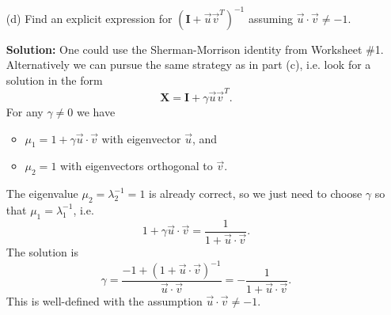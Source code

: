 \documentclass[11pt,fleqn]{article}
\begin{document}
\begin{enumerate}
\begin{itemize}
	{\bf Solution:} The eigenvectors and eigenvalues of $\mathbf{X}^2$ are
		\begin{itemize}
		\item $\lambda_1 = 1 + \vec{u}\cdot\vec{v}$ with eigenvector $\vec{u}$, and
		\item $\lambda_2 = 1$ with eigenvectors orthogonal to $\vec{v}$.
		\end{itemize}
		Since the matrix is diagonalizable we can take the square root by just applying the square root to the eigenvalues and leaving the eigenvectors unchanged.
	Adding the identity does not change eigenvectors, and multiplying by a constant does not change eigenvectors, so consider 
	\[\mathbf{X} = \mathbf{I} + \beta \vec{u}\vec{v}^T.\]
	For any $\beta\neq 0$ we have
		\begin{itemize}
		\item $\mu_1 = 1 + \beta\vec{u}\cdot\vec{v}$ with eigenvector $\vec{u}$, and
		\item $\mu_2 = 1$ with eigenvectors orthogonal to $\vec{v}$.
		\end{itemize}
		The eigenvalue $\mu_2=\sqrt{\lambda_2} = 1$ is already correct, so we just need to choose $\beta$ so that $\mu_1 = \sqrt{\lambda_1}$, i.e.
		\[1+\beta \vec{u}\cdot\vec{v} = \sqrt{1 + \vec{u}\cdot\vec{v}}.\]
		The solution is
		\[\beta = \frac{-1+\sqrt{1+\vec{u}\cdot\vec{v}}}{\vec{u}\cdot\vec{v}} = \frac{1}{1+\sqrt{1+\vec{u}\cdot\vec{v}}}.\]
	\item[(d)] Find an explicit expression for $(\mathbf{I} + \vec{u}\vec{v}^T)^{-1}$ assuming $\vec{u}\cdot\vec{v}\neq -1$.
	
	{\bf Solution:} One could use the Sherman-Morrison identity from Worksheet \#1. Alternatively we can pursue the same strategy as in part (c), i.e. look for a solution in the form
		\[\mathbf{X} = \mathbf{I} + \gamma \vec{u}\vec{v}^T.\]
	For any $\gamma\neq 0$ we have
		\begin{itemize}
		\item $\mu_1 = 1 + \gamma\vec{u}\cdot\vec{v}$ with eigenvector $\vec{u}$, and
		\item $\mu_2 = 1$ with eigenvectors orthogonal to $\vec{v}$.
		\end{itemize}
		The eigenvalue $\mu_2=\lambda_2^{-1} = 1$ is already correct, so we just need to choose $\gamma$ so that $\mu_1 = \lambda_1^{-1}$, i.e.
		\[1+\gamma \vec{u}\cdot\vec{v} = \frac{1}{1 + \vec{u}\cdot\vec{v}}.\]
		The solution is
		\[\gamma = \frac{-1+(1+\vec{u}\cdot\vec{v})^{-1}}{\vec{u}\cdot\vec{v}}=-\frac{1}{1+\vec{u}\cdot\vec{v}}.\]
		This is well-defined with the assumption $\vec{u}\cdot\vec{v}\neq-1$.
	\end{itemize}


\end{enumerate}
\end{document}
